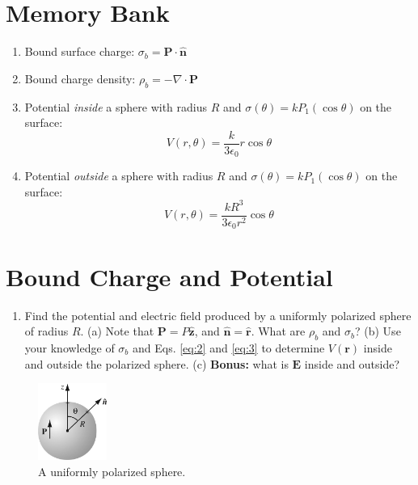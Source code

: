 \documentclass[12pt]{article}
\begin{document}
\maketitle
\small
\section{Memory Bank}
\begin{enumerate}
\item Bound surface charge: $\sigma_b = \mathbf{P} \cdot \hat{\mathbf{n}}$
\item Bound charge density: $\rho_b = -\nabla \cdot \mathbf{P}$
\item Potential \textit{inside} a sphere with radius $R$ and $\sigma(\theta) = k P_1(\cos\theta)$ on the surface:
\begin{equation}
V(r,\theta) = \frac{k}{3\epsilon_0}r\cos\theta \label{eq:2}
\end{equation}
\item Potential \textit{outside} a sphere with radius $R$ and $\sigma(\theta) = k P_1(\cos\theta)$ on the surface:
\begin{equation}
V(r,\theta) = \frac{kR^3}{3\epsilon_0 r^2}\cos\theta \label{eq:3}
\end{equation}
\end{enumerate}

\section{Bound Charge and Potential}

\begin{enumerate}
\item Find the potential and electric field produced by a uniformly polarized sphere of radius $R$.  (a) Note that $\mathbf{P} = P \hat{\mathbf{z}}$, and $\hat{\mathbf{n}} = \hat{\mathbf{r}}$.  What are $\rho_b$ and $\sigma_b$? (b) Use your knowledge of $\sigma_b$ and Eqs. \ref{eq:2} and \ref{eq:3} to determine $V(\mathbf{r})$ inside and outside the polarized sphere. (c) \textbf{Bonus:} what is $\mathbf{E}$ inside and outside?
\end{enumerate}

\begin{figure}
\centering
\includegraphics[width=0.2\textwidth]{figures/4_9.jpeg}
\caption{\label{fig:1} A uniformly polarized sphere.}
\end{figure}
\end{document}
